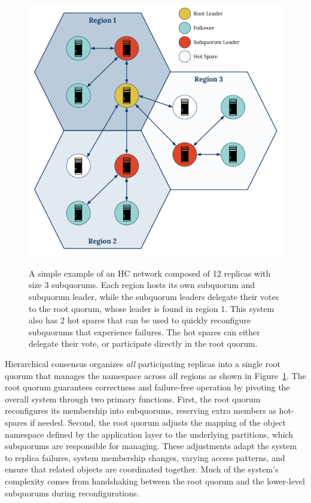 \begin{figure}
    \begin{center}
        \includegraphics[width=5in]{figures/ch03_hierarchical_topology.pdf}
    \end{center}
    \renewcommand{\baselinestretch}{1}
    \small\normalsize

    \begin{quote}
        \caption[A 12x3 Hierarchical Consensus Network Topology]{A simple example of an HC network composed of 12 replicas with size 3 subquorums. Each region hosts its own subquorum and subquorum leader, while the subquorum leaders delegate their votes to the root quorum, whose leader is found in region 1. This system also has 2 hot spares that can be used to quickly reconfigure subquorums that experience failures. The hot spares can either delegate their vote, or participate directly in the root quorum.}
        \label{fig:ch03_hierarchical_topology}
    \end{quote}
\end{figure}
\renewcommand{\baselinestretch}{2}
\small\normalsize

Hierarchical consensus organizes \emph{all} participating replicas into a single root quorum that manages the namespace across all regions as shown in Figure~\ref{fig:ch03_hierarchical_topology}.
The root quorum guarantees correctness and failure-free operation by pivoting the overall system through two primary functions.
First, the root quorum reconfigures its membership into subquorums, reserving extra members as hot-spares if needed.
Second, the root quorum adjusts the mapping of the object namespace defined by the application layer to the underlying partitions, which subquorums are responsible for managing.
These adjustments adapt the system to replica failures, system membership changes, varying access patterns, and ensure that related objects are coordinated together.
Much of the system's complexity comes from handshaking between the root quorum and the lower-level subquorums during reconfigurations.


